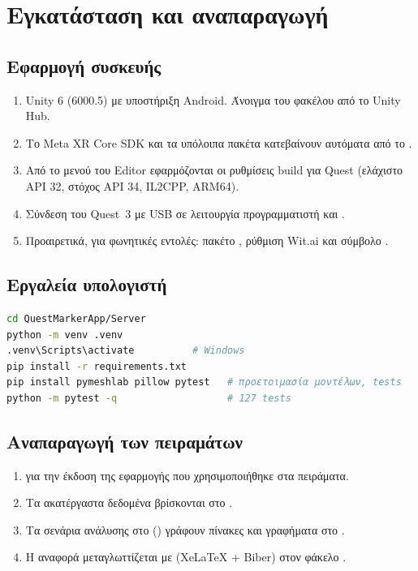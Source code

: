 \chapter{Εγκατάσταση και αναπαραγωγή}
\label{app:build}

\section{Εφαρμογή συσκευής}

\begin{enumerate}
  \item Unity 6 (6000.5) με υποστήριξη Android. Άνοιγμα του φακέλου  από το Unity Hub.
  \item Το Meta XR Core SDK και τα υπόλοιπα πακέτα κατεβαίνουν αυτόματα από το .
  \item Από το μενού  του Editor εφαρμόζονται οι ρυθμίσεις build για Quest (ελάχιστο API 32, στόχος API 34, IL2CPP, ARM64).
  \item Σύνδεση του Quest~3 με USB σε λειτουργία προγραμματιστή και .
  \item Προαιρετικά, για φωνητικές εντολές: πακέτο , ρύθμιση Wit.ai και σύμβολο .
\end{enumerate}

\section{Εργαλεία υπολογιστή}

\begin{lstlisting}[language=bash,caption={Εγκατάσταση και έλεγχος των εργαλείων Python.}]
cd QuestMarkerApp/Server
python -m venv .venv
.venv\Scripts\activate          # Windows
pip install -r requirements.txt
pip install pymeshlab pillow pytest   # προετοιμασία μοντέλων, tests
python -m pytest -q                   # 127 tests
\end{lstlisting}

\section{Αναπαραγωγή των πειραμάτων}

\begin{enumerate}
  \item {} για την έκδοση της εφαρμογής που χρησιμοποιήθηκε στα πειράματα.
  \item Τα ακατέργαστα δεδομένα βρίσκονται στο .
  \item Τα σενάρια ανάλυσης στο  () γράφουν πίνακες και γραφήματα στο .
  \item Η αναφορά μεταγλωττίζεται με  (XeLaTeX + Biber) στον φάκελο .
\end{enumerate}
